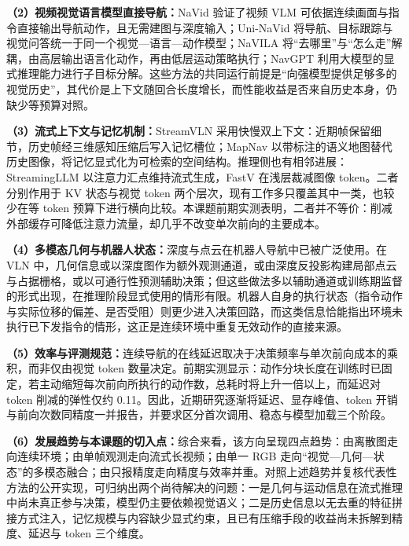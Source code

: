 \textbf{（2）视频视觉语言模型直接导航：}NaVid 验证了视频 VLM 可依据连续画面与指令直接输出导航动作，且无需建图与深度输入\cite{zhang2024navid}；Uni-NaVid 将导航、目标跟踪与视觉问答统一于同一个视觉—语言—动作模型\cite{zhang2025uninavid}；NaVILA 将“去哪里”与“怎么走”解耦，由高层输出语言化动作，再由低层运动策略执行\cite{cheng2025navila}；NavGPT 利用大模型的显式推理能力进行子目标分解\cite{zhou2024navgpt}。这些方法的共同运行前提是“向强模型提供足够多的视觉历史”，其代价是上下文随回合长度增长，而性能收益是否来自历史本身，仍缺少等预算对照。

\textbf{（3）流式上下文与记忆机制：}StreamVLN 采用快慢双上下文：近期帧保留细节，历史帧经三维感知压缩后写入记忆槽位\cite{wei2025streamvln}；MapNav 以带标注的语义地图替代历史图像，将记忆显式化为可检索的空间结构\cite{zhang2025mapnav}。推理侧也有相邻进展：StreamingLLM 以注意力汇点维持流式生成\cite{xiao2024streamingllm}，FastV 在浅层裁减图像 token\cite{chen2024fastv}。二者分别作用于 KV 状态与视觉 token 两个层次，现有工作多只覆盖其中一类，也较少在等 token 预算下进行横向比较。本课题前期实测表明，二者并不等价：削减外部缓存可降低注意力流量，却几乎不改变单次前向的主要成本。

\textbf{（4）多模态几何与机器人状态：}深度与点云在机器人导航中已被广泛使用。在 VLN 中，几何信息或以深度图作为额外观测通道，或由深度反投影构建局部点云与占据栅格，或以可通行性预测辅助决策；但这些做法多以辅助通道或训练期监督的形式出现，在推理阶段显式使用的情形有限。机器人自身的执行状态（指令动作与实际位移的偏差、是否受阻）则更少进入决策回路，而这类信息恰能指出环境未执行已下发指令的情形，这正是连续环境中重复无效动作的直接来源。

\textbf{（5）效率与评测规范：}连续导航的在线延迟取决于决策频率与单次前向成本的乘积，而非仅由视觉 token 数量决定。前期实测显示：动作分块长度在训练时已固定，若主动缩短每次前向所执行的动作数，总耗时将上升一倍以上，而延迟对 token 削减的弹性仅约 0.11。因此，近期研究逐渐将延迟、显存峰值、token 开销与前向次数同精度一并报告，并要求区分首次调用、稳态与模型加载三个阶段。

\textbf{（6）发展趋势与本课题的切入点：}综合来看，该方向呈现四点趋势：由离散图走向连续环境；由单帧观测走向流式长视频；由单一 RGB 走向“视觉—几何—状态”的多模态融合；由只报精度走向精度与效率并重。对照上述趋势并复核代表性方法的公开实现，可归纳出两个尚待解决的问题：一是几何与运动信息在流式推理中尚未真正参与决策，模型仍主要依赖视觉语义；二是历史信息以无去重的特征拼接方式注入，记忆规模与内容缺少显式约束，且已有压缩手段的收益尚未拆解到精度、延迟与 token 三个维度。


